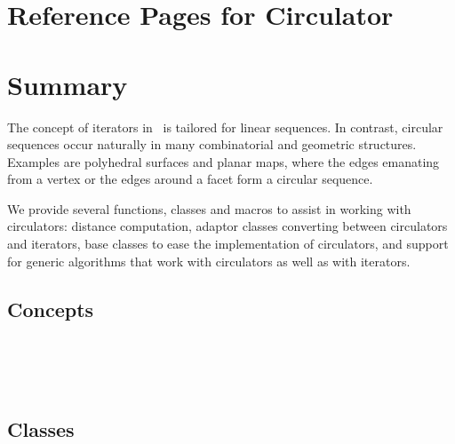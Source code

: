 
\section{Reference Pages for Circulator}

\section*{Summary}

The concept of iterators in \stl\ is tailored for linear sequences.
In contrast, circular sequences occur naturally in many combinatorial
and geometric structures. Examples are polyhedral surfaces and planar
maps, where the edges emanating from a vertex or the edges around a
facet form a circular sequence. 

We provide several functions, classes and macros to assist in working
with circulators: distance computation, adaptor classes converting
between circulators and iterators, base classes to ease the implementation
of circulators, and support for generic algorithms that work with
circulators as well as with iterators.

\subsection*{Concepts}

\\
\\
\\

\subsection*{Classes}

\\
\\
\\

